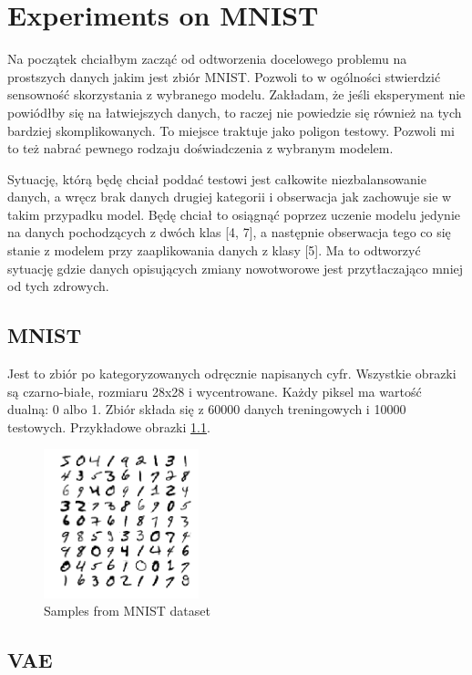 \chapter{Experiments on MNIST}

Na początek chciałbym zacząć od odtworzenia docelowego problemu na prostszych danych jakim jest zbiór MNIST. Pozwoli to w ogólności stwierdzić sensowność skorzystania z wybranego modelu. Zakładam, że jeśli eksperyment nie powiódłby się na łatwiejszych danych, to raczej nie powiedzie się również na tych bardziej skomplikowanych. To miejsce traktuje jako poligon testowy. Pozwoli mi to też nabrać pewnego rodzaju doświadczenia z wybranym modelem.

Sytuację, którą będę chciał poddać testowi jest całkowite niezbalansowanie danych, a wręcz brak danych drugiej kategorii i obserwacja jak zachowuje sie w takim przypadku model. Będę chciał to osiągnąć poprzez uczenie modelu jedynie na danych pochodzących z dwóch klas [4, 7], a następnie obserwacja tego co się stanie z modelem przy zaaplikowania danych z klasy [5]. Ma to odtworzyć sytuację gdzie danych opisujących zmiany nowotworowe jest przytłaczająco mniej od tych zdrowych.

\section{MNIST}

Jest to zbiór po kategoryzowanych odręcznie napisanych cyfr. Wszystkie obrazki są czarno-białe, rozmiaru 28x28 i wycentrowane. Każdy piksel ma wartość dualną: 0 albo 1. Zbiór składa się z 60000 danych treningowych i 10000 testowych. Przykładowe obrazki \ref{fig:mnist}.

\begin{figure}[h!]
    \centering
    \includegraphics[width=0.4\textwidth]{images/mnist_v2}
    \caption{Samples from MNIST dataset}
    \label{fig:mnist}
\end{figure}

\section{VAE}

